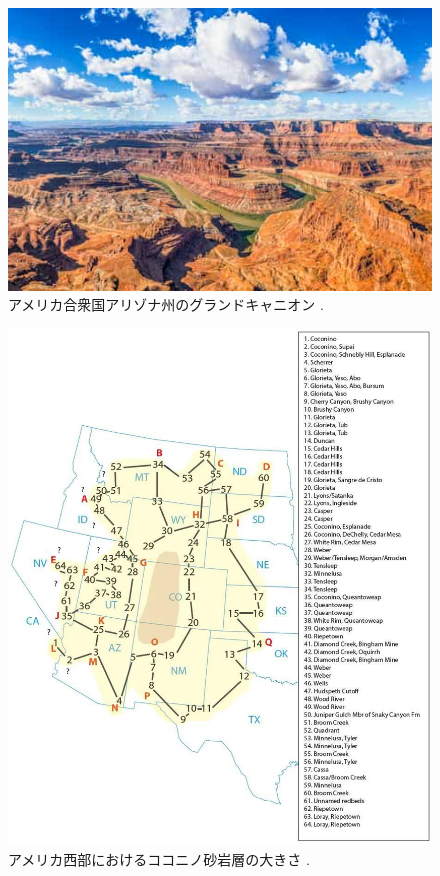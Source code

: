 \documentclass[10pt,twocolumn,letterpaper]{article}
\begin{document}
\begin{figure}[b]
\begin{center}
   \includegraphics[width=1\linewidth]{grand-canyon.jpg}
\end{center}
   \caption{アメリカ合衆国アリゾナ州のグランドキャニオン \cite{49}.}
\label{fig:2}
\label{fig:onecol}
\end{figure}

\begin{figure}[t]

\begin{center}
   \includegraphics[width=1\linewidth]{coconino.jpg}
\end{center}
   \caption{アメリカ西部におけるココニノ砂岩層の大きさ \cite{21}.}
\label{fig:3}
\label{fig:onecol}
\end{figure}
\end{document}
